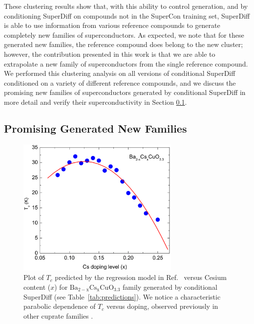 \documentclass[%
reprint,
 amsmath,amssymb,
 aps,
prb,
]{revtex4-2}
\begin{document}
These clustering results show that, with this ability to control generation, and by conditioning SuperDiff on compounds not in the SuperCon training set, SuperDiff is able to use information from various reference compounds to generate completely new families of superconductors. As expected, we note that for these generated new families, the reference compound does belong to the new cluster; however, the contribution presented in this work is that we are able to extrapolate a new family of superconductors from the single reference compound. We performed this clustering analysis on all versions of conditional SuperDiff conditioned on a variety of different reference compounds, and we discuss the promising new families of superconductors generated by conditional SuperDiff in more detail and verify their superconductivity in Section \ref{sec:newfamilies}. 




\subsection{Promising Generated New Families}
\label{sec:newfamilies}

\begin{figure}
    \centering
    \hspace*{-0.5cm}\includegraphics[width=8cm]{BaCsCuO-doping-1.png}
    \caption{Plot of $T_c$ predicted by the regression model in Ref.~\cite{ROTER20201353689} versus Cesium content ($x$) for $\mathrm{Ba_{2-x}Cs_{x}CuO_{3.3}}$ family generated by conditional SuperDiff (see Table~\ref{tab:predictions}). We notice a characteristic parabolic dependence of $T_c$ versus doping, observed previously in other cuprate families \cite{TALLON200153}.}
    \label{fig:doping}
\end{figure}
\end{document}

